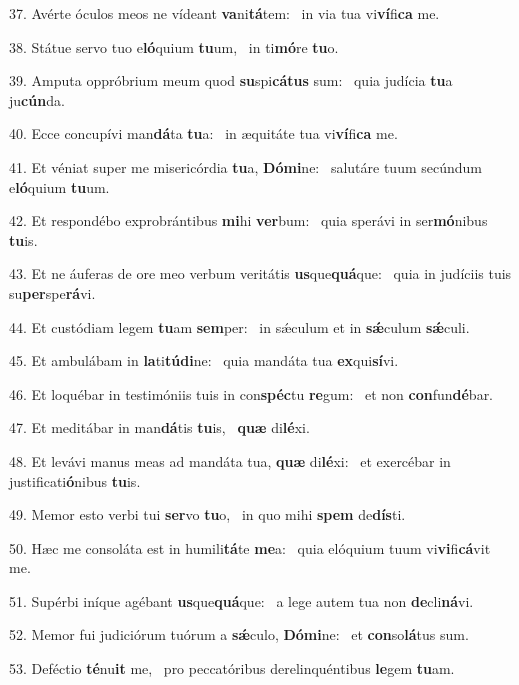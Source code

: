 37. Avérte óculos meos ne vídeant \textbf{va}ni\textbf{tá}tem: \ast\  in via tua vi\textbf{ví}fi\textbf{ca} me.\

38. Státue servo tuo e\textbf{ló}quium \textbf{tu}um, \ast\  in ti\textbf{mó}re \textbf{tu}o.\

39. Amputa oppróbrium meum quod \textbf{su}spi\textbf{cá}\textbf{tus} sum: \ast\  quia judícia \textbf{tu}a ju\textbf{cún}da.\

40. Ecce concupívi man\textbf{dá}ta \textbf{tu}a: \ast\  in æquitáte tua vi\textbf{ví}fi\textbf{ca} me.\

41. Et véniat super me misericórdia \textbf{tu}a, \textbf{Dó}\textbf{mi}ne: \ast\  salutáre tuum secúndum e\textbf{ló}quium \textbf{tu}um.\

42. Et respondébo exprobrántibus \textbf{mi}hi \textbf{ver}bum: \ast\  quia sperávi in ser\textbf{mó}nibus \textbf{tu}is.\

43. Et ne áuferas de ore meo verbum veritátis \textbf{us}que\textbf{quá}que: \ast\  quia in judíciis tuis su\textbf{per}spe\textbf{rá}vi.\

44. Et custódiam legem \textbf{tu}am \textbf{sem}per: \ast\  in sǽculum et in \textbf{sǽ}culum \textbf{sǽ}culi.\

45. Et ambulábam in \textbf{la}ti\textbf{tú}\textbf{di}ne: \ast\  quia mandáta tua \textbf{ex}qui\textbf{sí}vi.\

46. Et loquébar in testimóniis tuis in con\textbf{spéc}tu \textbf{re}gum: \ast\  et non \textbf{con}fun\textbf{dé}bar.\

47. Et meditábar in man\textbf{dá}tis \textbf{tu}is, \ast\  \textbf{quæ} di\textbf{lé}xi.\

48. Et levávi manus meas ad mandáta tua, \textbf{quæ} di\textbf{lé}xi: \ast\  et exercébar in justificati\textbf{ó}nibus \textbf{tu}is.\

49. Memor esto verbi tui \textbf{ser}vo \textbf{tu}o, \ast\  in quo mihi \textbf{spem} de\textbf{dís}ti.\

50. Hæc me consoláta est in humili\textbf{tá}te \textbf{me}a: \ast\  quia elóquium tuum vi\textbf{vi}fi\textbf{cá}vit me.\

51. Supérbi iníque agébant \textbf{us}que\textbf{quá}que: \ast\  a lege autem tua non \textbf{de}cli\textbf{ná}vi.\

52. Memor fui judiciórum tuórum a \textbf{sǽ}culo, \textbf{Dó}\textbf{mi}ne: \ast\  et \textbf{con}so\textbf{lá}tus sum.\

53. Deféctio \textbf{té}nu\textbf{it} me, \ast\  pro peccatóribus derelinquéntibus \textbf{le}gem \textbf{tu}am.\

